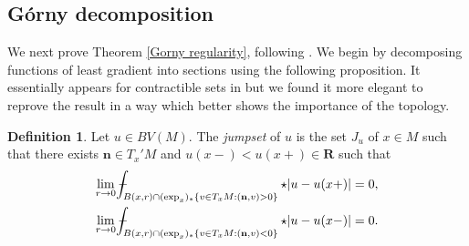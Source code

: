 \documentclass[reqno,10pt]{amsart}
\newcommand{\RR}{\mathbf{R}}
\newcommand{\normal}{\mathbf n}
\newcommand{\dfn}[1]{\emph{#1}\index{#1}}
\theoremstyle{definition}
\newtheorem{definition}[theorem]{Definition}
\numberwithin{equation}{section}
\def\Xint#1{\mathchoice
{\XXint\displaystyle\textstyle{#1}}%
{\XXint\textstyle\scriptstyle{#1}}%
{\XXint\scriptstyle\scriptscriptstyle{#1}}%
{\XXint\scriptscriptstyle\scriptscriptstyle{#1}}%
\!\int}
\def\XXint#1#2#3{{\setbox0=\hbox{$#1{#2#3}{\int}$ }
\vcenter{\hbox{$#2#3$ }}\kern-.6\wd0}}
\def\dashint{\Xint-}
\begin{document}
\subsection{G\'orny decomposition}
We next prove Theorem \ref{Gorny regularity}, following \cite[pg8--11]{górny2017planar}.
We begin by decomposing functions of least gradient into sections using the following proposition.
It essentially appears for contractible sets in \cite[pg10--11]{górny2017planar} but we found it more elegant to reprove the result in a way which better shows the importance of the topology.

\begin{definition}
Let $u \in BV(M)$. The \dfn{jumpset} of $u$ is the set $J_u$ of $x \in M$ such that there exists $\normal \in T_x'M$ and $u(x-) < u(x+) \in \RR$ such that 
\begin{align*}
\lim_{r \to 0} \dashint_{B(x, r) \cap (\exp_x)_* \{v \in T_xM: (\normal, v) > 0\}} \star |u - u(x+)|  & = 0, \\
\lim_{r \to 0} \dashint_{B(x, r) \cap (\exp_x)_* \{v \in T_xM: (\normal, v) < 0\}} \star |u - u(x-)|  & = 0.
\end{align*}
\end{definition}
\end{document}
